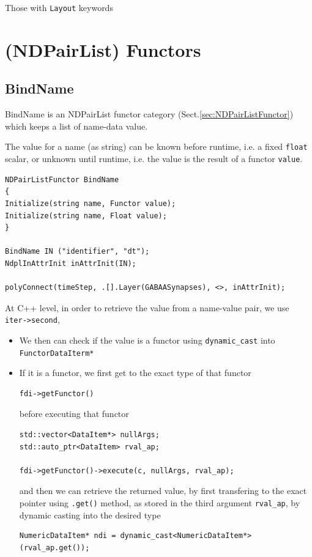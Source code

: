 Those with \verb!Layout! keywords


\section{(NDPairList) Functors}

\subsection{BindName}
\label{sec:BindNameFunctor}

BindName is an NDPairList functor category (Sect.\ref{sec:NDPairListFunctor})
which keeps a list of name-data value.

The value for a name (as string) can be known before runtime, i.e. a fixed \verb!float! scalar, or
unknown until runtime, i.e. the value is the result of a functor \verb!value!. 

\begin{verbatim}
NDPairListFunctor BindName
{
Initialize(string name, Functor value);
Initialize(string name, Float value);
}

BindName IN ("identifier", "dt");
NdplInAttrInit inAttrInit(IN);

polyConnect(timeStep, .[].Layer(GABAASynapses), <>, inAttrInit);

\end{verbatim}

At C++ level, in order to retrieve the value from a name-value pair,
we use \verb!iter->second!, 
\begin{itemize}
  \item We then can check if the value is a functor using \verb!dynamic_cast!
  into \verb!FunctorDataIterm*!
  
  \item If it is a functor, we first get to the exact type of that functor

\begin{verbatim}
fdi->getFunctor()
\end{verbatim}
  before executing that functor
\begin{verbatim}
std::vector<DataItem*> nullArgs;
std::auto_ptr<DataItem> rval_ap;

fdi->getFunctor()->execute(c, nullArgs, rval_ap);
\end{verbatim}
and then we can retrieve the returned value, by first transfering to the exact
pointer using \verb!.get()! method, as stored in the third argument
\verb!rval_ap!, by dynamic casting into the desired type

\begin{verbatim}
NumericDataItem* ndi = dynamic_cast<NumericDataItem*>(rval_ap.get());
\end{verbatim}

\end{itemize}


